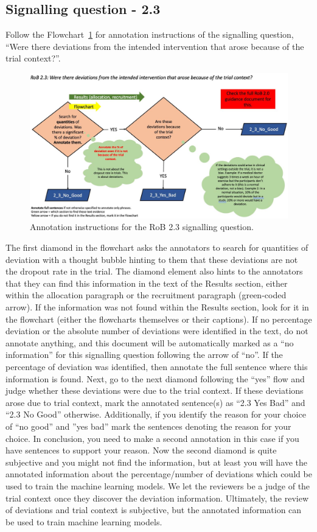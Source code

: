 \documentclass[sn-mathphys,Numbered]{sn-jnl}%
\begin{document}
%
%
%
\subsection*{Signalling question - 2.3}
\label{subsec:2_3}
%
Follow the Flowchart~\ref{fig:2_3} for annotation instructions of the signalling question, ``Were there deviations from the intended intervention that arose because of the trial context?''.
%
\begin{figure}[hbt]
    \centering
    \includegraphics[width=\textwidth]{figures/2_3.jpg}
    \caption{Annotation instructions for the RoB 2.3 signalling question.}
    \label{fig:2_3}
\end{figure}
%


The first diamond in the flowchart asks the annotators to search for quantities of deviation with a thought bubble hinting to them that these deviations are not the dropout rate in the trial.
The diamond element also hints to the annotators that they can find this information in the text of the Results section, either within the allocation paragraph or the recruitment paragraph (green-coded arrow).
If the information was not found within the Results section, look for it in the flowchart (either the flowcharts themselves or their captions).
If no percentage deviation or the absolute number of deviations were identified in the text, do not annotate anything, and this document will be automatically marked as a ``no information'' for this signalling question following the arrow of ``no''.
If the percentage of deviation was identified, then annotate the full sentence where this information is found.
Next, go to the next diamond following the ``yes'' flow and judge whether these deviations were due to the trial context.
If these deviations arose due to trial context, mark the annotated sentence(s) as ``2.3 Yes Bad'' and ``2.3 No Good'' otherwise.
Additionally, if you identify the reason for your choice of ``no good'' and ''yes bad'' mark the sentences denoting the reason for your choice.
In conclusion, you need to make a second annotation in this case if you have sentences to support your reason.
Now the second diamond is quite subjective and you might not find the information, but at least you will have the annotated information about the percentage/number of deviations which could be used to train the machine learning models.
We let the reviewers be a judge of the trial context once they discover the deviation information.
Ultimately, the review of deviations and trial context is subjective, but the annotated information can be used to train machine learning models.
%
%
%
\end{document}
